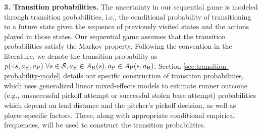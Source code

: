 \documentclass[opre,dblanonrev]{informs4}
\begin{document}
    {\bf 3. Transition probabilities.} The uncertainty in our sequential game is modeled through transition probabilities, i.e., the conditional probability of transitioning to a future state given the sequence of previously visited states and the actions played in those states. Our sequential game assumes that the transition probabilities satisfy the Markov property.  Following the convention in the literature, we denote the transition probability as $p(\cdot|s,a_\text{R},a_\text{P}) \ \forall s \in {\cal S}, a_\text{R} \in A_\text{R}(s), a_\text{P} \in A_\text{P}(s,a_\text{R})$. Section \ref{sec:transition-probability-model} details our specific construction of transition probabilities, which uses generalized linear mixed-effects models to estimate runner outcome (e.g., unsuccessful pickoff attempt or successful stolen base attempt) probabilities which depend on lead distance and the pitcher's pickoff decision, as well as player-specific factors. These, along with appropriate conditional empirical frequencies, will be used to construct the transition probabilities.
\end{document}
